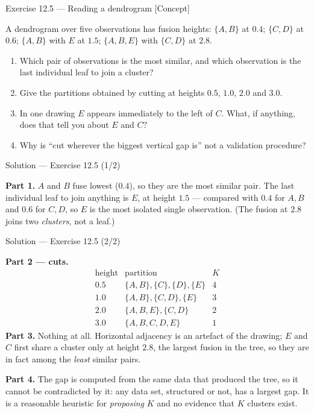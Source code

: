 \documentclass[aspectratio=169,11pt]{beamer}
\begin{document}
\begin{frame}{Exercise 12.5 --- Reading a dendrogram [Concept]}
\begin{exercise}
  A dendrogram over five observations has fusion heights: $\{A,B\}$ at $0.4$;
  $\{C,D\}$ at $0.6$; $\{A,B\}$ with $E$ at $1.5$; $\{A,B,E\}$ with $\{C,D\}$ at $2.8$.
  \begin{enumerate}
    \item Which pair of observations is the most similar, and which observation is the last
          individual leaf to join a cluster?
    \item Give the partitions obtained by cutting at heights $0.5$, $1.0$, $2.0$ and
          $3.0$.
    \item In one drawing $E$ appears immediately to the left of $C$. What, if anything,
          does that tell you about $E$ and $C$?
    \item Why is ``cut wherever the biggest vertical gap is'' not a validation procedure?
  \end{enumerate}
\end{exercise}
\end{frame}

\begin{frame}{Solution --- Exercise 12.5 (1/2)}
\begin{solutionbox}
  \textbf{Part 1.} $A$ and $B$ fuse lowest ($0.4$), so they are the most similar pair. The
  last individual leaf to join anything is $E$, at height $1.5$ --- compared with $0.4$ for
  $A,B$ and $0.6$ for $C,D$, so $E$ is the most isolated single observation. (The fusion at
  $2.8$ joins two \emph{clusters}, not a leaf.)
\end{solutionbox}
\end{frame}

\begin{frame}{Solution --- Exercise 12.5 (2/2)}
\begin{solutionbox}
  \medskip
  \textbf{Part 2 --- cuts.}
  \[
    \begin{array}{c|l|c}
      \text{height} & \text{partition} & K\\ \hline
      0.5 & \{A,B\},\{C\},\{D\},\{E\} & 4\\
      1.0 & \{A,B\},\{C,D\},\{E\} & 3\\
      2.0 & \{A,B,E\},\{C,D\} & 2\\
      3.0 & \{A,B,C,D,E\} & 1
    \end{array}
  \]
  \textbf{Part 3.} Nothing at all. Horizontal adjacency is an artefact of the drawing; $E$
  and $C$ first share a cluster only at height $2.8$, the largest fusion in the tree, so
  they are in fact among the \emph{least} similar pairs.

  \medskip
  \textbf{Part 4.} The gap is computed from the same data that produced the tree, so it
  cannot be contradicted by it: any data set, structured or not, has a largest gap. It is a
  reasonable heuristic for \emph{proposing} $K$ and no evidence that $K$ clusters exist.
\end{solutionbox}
\end{frame}
\end{document}
